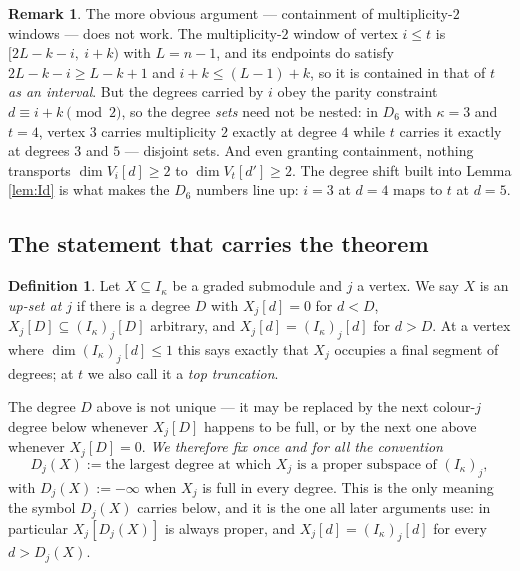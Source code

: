 \documentclass[reqno]{amsart}
\theoremstyle{plain}
\theoremstyle{definition}
\newtheorem{definition}[theorem]{Definition}
\newtheorem{remark}[theorem]{Remark}
\newcommand{\ka}{\kappa}
\begin{document}
\begin{remark}\label{rem:nowindow}
The more obvious argument --- containment of multiplicity-$2$ windows --- does
not work.  The multiplicity-$2$ window of vertex $i\le t$ is
$[2L-k-i,\ i+k)$ with $L=n-1$, and its endpoints do satisfy $2L-k-i\ge L-k+1$
and $i+k\le(L-1)+k$, so it is contained in that of $t$ \emph{as an interval}.
But the degrees carried by $i$ obey the parity constraint $d\equiv i+k\pmod2$,
so the degree \emph{sets} need not be nested: in $D_6$ with $\ka=3$ and $t=4$,
vertex $3$ carries multiplicity $2$ exactly at degree $4$ while $t$ carries it
exactly at degrees $3$ and $5$ --- disjoint sets.  And even granting
containment, nothing transports $\dim V_i[d]\ge2$ to $\dim V_t[d']\ge2$.  The
degree shift built into Lemma \ref{lem:Id} is what makes the $D_6$ numbers line
up: $i=3$ at $d=4$ maps to $t$ at $d=5$.
\end{remark}

\subsection{The statement that carries the theorem}

\begin{definition}\label{def:upset}
Let $X\subseteq I_\ka$ be a graded submodule and $j$ a vertex.  We say $X$ is an
\emph{up-set at $j$} if there is a degree $D$ with $X_j[d]=0$ for $d<D$,
$X_j[D]\subseteq(I_\ka)_j[D]$ arbitrary, and $X_j[d]=(I_\ka)_j[d]$ for $d>D$.
At a vertex where $\dim(I_\ka)_j[d]\le1$ this says exactly that $X_j$ occupies a
final segment of degrees; at $t$ we also call it a \emph{top truncation}.

The degree $D$ above is not unique --- it may be replaced by the next
colour-$j$ degree below whenever $X_j[D]$ happens to be full, or by the next
one above whenever $X_j[D]=0$.  \emph{We therefore fix once and for all the
convention}
\[
   D_j(X):=\text{the largest degree at which } X_j \text{ is a proper
   subspace of } (I_\ka)_j,
\]
with $D_j(X):=-\infty$ when $X_j$ is full in every degree.  This is the only
meaning the symbol $D_j(X)$ carries below, and it is the one all later
arguments use: in particular $X_j[D_j(X)]$ is always proper, and
$X_j[d]=(I_\ka)_j[d]$ for every $d>D_j(X)$.
\end{definition}
\end{document}
